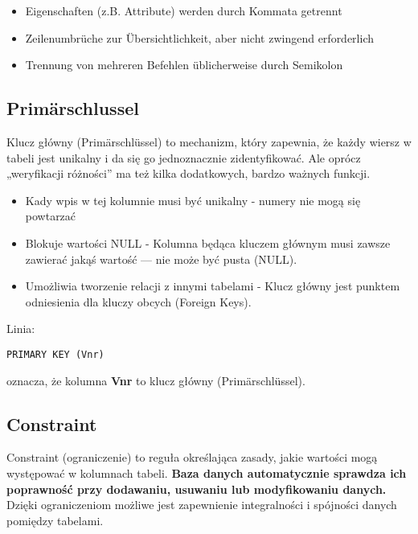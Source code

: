 \begin{itemize}
    \item Eigenschaften (z.B. Attribute) werden durch Kommata getrennt
    \item Zeilenumbrüche zur Übersichtlichkeit, aber nicht zwingend erforderlich
    \item Trennung von  mehreren Befehlen üblicherweise durch Semikolon
\end{itemize}

\subsection{Primärschlussel}
Klucz główny (Primärschlüssel) to mechanizm, który zapewnia, że każdy wiersz w tabeli jest unikalny i da się go jednoznacznie zidentyfikować. Ale oprócz „weryfikacji różności” ma też kilka dodatkowych, bardzo ważnych funkcji.
\begin{itemize}
    \item Kady wpis w tej kolumnie musi być unikalny - numery nie mogą się powtarzać
    \item Blokuje wartości NULL - Kolumna będąca kluczem głównym musi zawsze zawierać jakąś wartość — nie może być pusta (NULL).
    \item Umożliwia tworzenie relacji z innymi tabelami - Klucz główny jest punktem odniesienia dla kluczy obcych (Foreign Keys).
\end{itemize}

Linia:
\begin{lstlisting}[style=sqlstyle]
    PRIMARY KEY (Vnr)
\end{lstlisting}
oznacza, że kolumna \textbf{Vnr} to klucz główny (Primärschlüssel).

\subsection{Constraint}
Constraint (ograniczenie) to reguła określająca zasady, jakie wartości mogą występować w kolumnach tabeli. 
\textbf{Baza danych automatycznie sprawdza ich poprawność przy dodawaniu, usuwaniu lub modyfikowaniu danych.} 
Dzięki ograniczeniom możliwe jest zapewnienie integralności i spójności danych pomiędzy tabelami.

